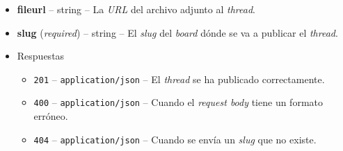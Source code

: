 \documentclass[12pt,a4paper,titlepage]{article}
\begin{document}
\begin{itemize}
\begin{itemize}
\begin{itemize}
                \item \textbf{fileurl} -- string -- La \textit{URL} del archivo adjunto al \textit{thread}.
                \item \textbf{slug} (\textit{required}) -- string -- El \textit{slug} del \textit{board} dónde se va a publicar el \textit{thread}.
            \end{itemize}
        \end{itemize}
        \begin{itemize}
            \item Respuestas
            \begin{itemize}
                \item \texttt{201} -- \texttt{application/json} -- El \textit{thread} se ha publicado correctamente.
                \item \texttt{400} -- \texttt{application/json} -- Cuando el \textit{request body} tiene un formato erróneo.
                \item \texttt{404} -- \texttt{application/json} -- Cuando se envía un \textit{slug} que no existe.
            \end{itemize}
        \end{itemize}
    \end{itemize}

    
\end{document}
